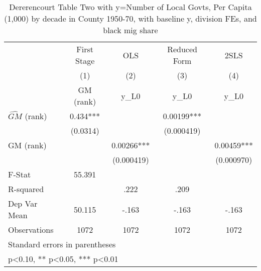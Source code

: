 \begin{table}[htbp]\centering
\def\sym#1{\ifmmode^{#1}\else\(^{#1}\)\fi}
\caption{Dererencourt Table Two with y=Number of Local Govts, Per Capita (1,000) by decade in County 1950-70, with baseline y, division FEs, and black mig share}
\begin{tabular}{l*{4}{c}}
\toprule
                    & First Stage   &         OLS   &Reduced Form   &        2SLS   \\
                    &\multicolumn{1}{c}{(1)}&\multicolumn{1}{c}{(2)}&\multicolumn{1}{c}{(3)}&\multicolumn{1}{c}{(4)}\\
                    &\multicolumn{1}{c}{GM  (rank)}&\multicolumn{1}{c}{y\_L0}&\multicolumn{1}{c}{y\_L0}&\multicolumn{1}{c}{y\_L0}\\
\midrule
$\hat{GM}$ (rank)   &       0.434***&               &     0.00199***&               \\
                    &    (0.0314)   &               &  (0.000419)   &               \\
\addlinespace
GM  (rank)          &               &     0.00266***&               &     0.00459***\\
                    &               &  (0.000419)   &               &  (0.000970)   \\
\midrule
F-Stat              &      55.391   &               &               &               \\
R-squared           &               &        .222   &        .209   &               \\
Dep Var Mean        &      50.115   &       -.163   &       -.163   &       -.163   \\
Observations        &        1072   &        1072   &        1072   &        1072   \\
\bottomrule
\multicolumn{5}{l}{\footnotesize Standard errors in parentheses}\\
\multicolumn{5}{l}{\footnotesize * p<0.10, ** p<0.05, *** p<0.01}\\
\end{tabular}
\end{table}
